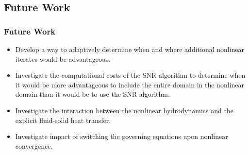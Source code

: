 \documentclass[compress,xcolor=table]{beamer}
\begin{document}
\subsection[Future Work]{Future Work}
\begin{frame}
\frametitle{Future Work}

\begin{itemize}
\item{Develop a way to adaptively determine when and where additional nonlinear iterates would be advantageous.}
\item{Investigate the computational costs of the SNR algorithm to determine when it would be more advantageous to include the entire domain in the nonlinear domain than it would be to use the SNR algorithm.}
\item{Investigate the interaction between the nonlinear hydrodynamics and the explicit fluid-solid heat transfer.}
\item{Investigate impact of switching the governing equations upon nonlinear convergence.}
\end{itemize}

\end{frame}
\appendix
\end{document}

